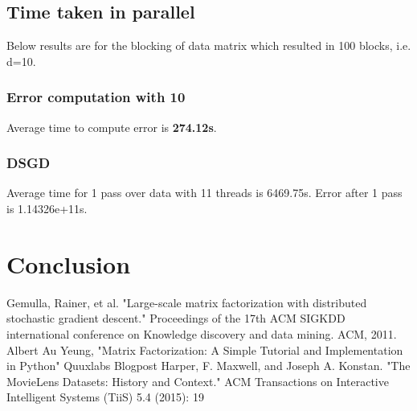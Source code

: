 \documentclass[a4paper,11pt]{article}
\begin{document}
\subsection{Time taken in parallel}
Below results are for the blocking of data matrix which resulted in 100 blocks, i.e. d=10. 
\subsubsection{Error computation with 10}
Average time to compute error is \textbf{274.12s}.
\subsubsection{DSGD}
Average time for 1 pass over data with 11 threads is 6469.75s.
Error after 1 pass is 1.14326e+11s.
\section{Conclusion}
\begin{thebibliography}{9}
  Gemulla, Rainer, et al. "Large-scale matrix factorization with distributed stochastic gradient descent." Proceedings of the 17th ACM SIGKDD international conference on Knowledge discovery and data mining. ACM, 2011.
  Albert Au Yeung, "Matrix Factorization: A Simple Tutorial and Implementation in Python" Quuxlabs Blogpost
  Harper, F. Maxwell, and Joseph A. Konstan. "The MovieLens Datasets: History and Context." ACM Transactions on Interactive Intelligent Systems (TiiS) 5.4 (2015): 19
\end{thebibliography}
\end{document}
